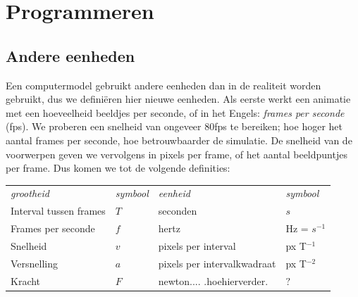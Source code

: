 \documentclass[12pt,a4paper]{article}
\begin{document}
	\newpage

	\section{Programmeren}
	\subsection{Andere eenheden}
	Een computermodel gebruikt andere eenheden dan in de realiteit worden gebruikt, dus we defini\"{e}ren hier nieuwe eenheden. Als eerste werkt een animatie met een hoeveelheid beeldjes per seconde, of in het Engels: \emph{frames per seconde} (fps). We proberen een snelheid van ongeveer $80$fps te bereiken; hoe hoger het aantal frames per seconde, hoe betrouwbaarder de simulatie. De snelheid van de voorwerpen geven we vervolgens in pixels per frame, of het aantal beeldpuntjes per frame. Dus komen we tot de volgende definities:
	\\
	\begin{tabular}{| l l l l |}
		\hline 
		\emph{grootheid}       & \emph{symbool} & \emph{eenheid}                    & \emph{symbool} \\
		Interval tussen frames & $T$            & seconden                          & $s$            \\
		Frames per seconde     & $f$            & hertz                             & Hz = $s^{-1}$  \\
		Snelheid               & $v$            & pixels per interval               & px T$^{-1}$    \\
		Versnelling            & $a$            & pixels per intervalkwadraat       & px T$^{-2}$    \\
		Kracht                 & $F$            & newton.... .hoehierverder.        & $?$            \\
		\hline 
	\end{tabular}
	
\end{document}

